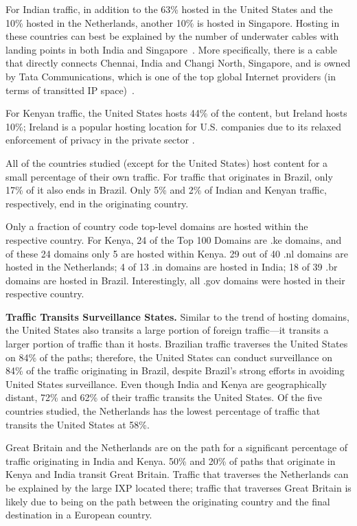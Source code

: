For Indian traffic, in addition to the 63\% hosted in the United States and the 10\% hosted in the Netherlands, another 10\% is hosted in Singapore.  Hosting in these countries can best be explained by the number of underwater cables with landing points in both India and Singapore~\cite{cablemap}.  More specifically, there is a cable that directly connects Chennai, India and Changi North, Singapore, and is owned by Tata Communications, which is one of the top global Internet providers (in terms of transitted IP space)~\cite{bakers}.  

For Kenyan traffic, the United States hosts 44\% of the content, but Ireland hosts 10\%; Ireland is a popular hosting location for U.S. companies due to its relaxed enforcement of privacy in the private sector .  

All of the countries studied (except for the United States) host content for a small percentage of their own traffic.  For traffic that originates in Brazil, only 17\% of it also ends in Brazil.  Only 5\% and 2\% of Indian and Kenyan traffic, respectively, end in the originating country.  

Only a fraction of country code top-level domains are hosted within the respective country.  For Kenya, 24 of the Top 100 Domains are .ke domains, and of these 24 domains only 5 are hosted within Kenya.  29 out of 40 .nl domains are hosted in the Netherlands; 4 of 13 .in domains are hosted in India; 18 of 39 .br domains are hosted in Brazil.  Interestingly, all .gov domains were hosted in their respective country.

{\bf Traffic Transits Surveillance States.}
Similar to the trend of hosting domains, the United States also transits a large portion of foreign traffic---it transits a larger portion of traffic than it hosts.  Brazilian traffic traverses the United States on 84\% of the paths; therefore, the United States can conduct surveillance on 84\% of the traffic originating in Brazil, despite Brazil's strong efforts in avoiding United States surveillance.  Even though India and Kenya are geographically distant, 72\% and 62\% of their traffic transits the United States.  Of the five countries studied, the Netherlands has the lowest percentage of traffic that transits the United States at 58\%.  

Great Britain and the Netherlands are on the path for a significant percentage of traffic originating in India and Kenya.  50\% and 20\% of paths that originate in Kenya and India transit Great Britain.  Traffic that traverses the Netherlands can be explained by the large IXP located there; traffic that traverses Great Britain is likely due to being on the path between the originating country and the final destination in a European country.

